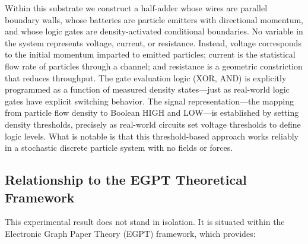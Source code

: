\documentclass[11pt,a4paper]{article}
\begin{document}
Within this substrate we construct a half-adder whose wires are parallel boundary walls, whose batteries are particle emitters with directional momentum, and whose logic gates are density-activated conditional boundaries. No variable in the system represents voltage, current, or resistance. Instead, voltage corresponds to the initial momentum imparted to emitted particles; current is the statistical flow rate of particles through a channel; and resistance is a geometric constriction that reduces throughput. The gate evaluation logic (XOR, AND) is explicitly programmed as a function of measured density states---just as real-world logic gates have explicit switching behavior. The signal representation---the mapping from particle flow density to Boolean HIGH and LOW---is established by setting density thresholds, precisely as real-world circuits set voltage thresholds to define logic levels. What is notable is that this threshold-based approach works reliably in a stochastic discrete particle system with no fields or forces.

\subsection{Relationship to the EGPT Theoretical Framework}

This experimental result does not stand in isolation. It is situated within the Electronic Graph Paper Theory (EGPT) framework, which provides:
\end{document}
